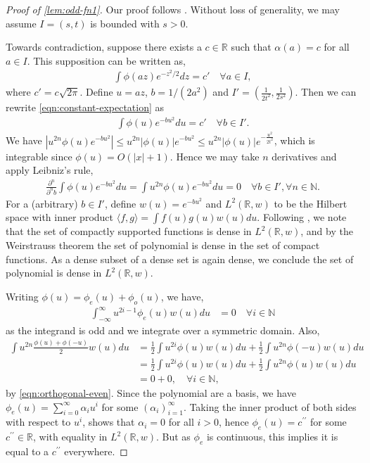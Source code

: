 \documentclass[twoside]{article}
\newcommand{\R}{\mathbb{R}}
\theoremstyle{theoremstyle}
\begin{document}
\begin{proof}[Proof of \cref{lem:odd-fn1}]
Our proof follows \citet{StackExchangeGaussiansDense}.
Without loss of generality, we may assume $I=(s,t)$ is bounded with $s>0$.

Towards contradiction, suppose there exists a $c \in \R$ such that $\alpha(a)=c$ for all $a \in I$. This supposition can be written as,
\begin{align}\label{eqn:constant-expectation}
    \int \phi(az) e^{-z^2/2} dz = c' \quad \forall a \in I,
\end{align}
where $c' = c\sqrt{2\pi}$. Define $u = az$, $b = 1/(2a^2)$ and $I'= \left(\frac{1}{2t^2}, \frac{1}{2s^2}\right)$. Then we can rewrite \cref{eqn:constant-expectation} as 
\begin{align}
    \int \phi(u) e^{-bu^2} du = c' \quad \forall b \in I'.
\end{align}
We have $|u^{2n}\phi(u)e^{-bu^2}|\leq u^{2n}|\phi(u)|e^{-bu^2} \leq   u^{2n}|\phi(u)|e^{-\frac{u^2}{2t^2}}$, which is integrable since $\phi(u)=O(|x|+1)$. Hence we may take $n$ derivatives and apply Leibniz's rule,
\begin{align}\label{eqn:orthogonal-even}
    \frac{\partial^n}{\partial^n b} \int \phi(u) e^{-bu^2} du =  \int u^{2n} \phi(u) e^{-bu^2} du = 0 \quad \forall b \in I', \forall n \in \mathbb{N}.
\end{align}
For a (arbitrary) $b \in I'$, define $w(u) = e^{-bu^2}$ and $L^2(\R, w)$ to be the Hilbert space with inner product $\langle f,g \rangle = \int f(u)g(u)w(u)du$. 
Following 
\citet{126471}, we note that the set of compactly supported functions is dense in $L^2(\R, w)$, and by the Weirstrauss theorem the set of polynomial is dense in the set of compact functions. As a dense subset of a dense set is again dense, we conclude the set of polynomial is dense in $L^2(\R, w)$. 

Writing $\phi(u) = \phi_e(u) + \phi_o(u)$, we have,
\begin{align}
    \int_{-\infty}^\infty u^{2i-1} \phi_e(u) w(u) du &= 0 \quad \forall i \in \mathbb{N}
\end{align}
as the integrand is odd and we integrate over a symmetric domain. Also,
\begin{align}
    \int u^{2n} \frac{\phi(u)+ \phi(-u)}{2}w(u) du &=
    \frac{1}{2}\int u^{2i} \phi(u)w(u) du + \frac{1}{2}\int u^{2n} \phi(-u)w(u) du \\
    &=\frac{1}{2}\int u^{2i} \phi(u)w(u) du + \frac{1}{2}\int u^{2n} \phi(u)w(u) du \\
    &=0 + 0, \quad \forall i \in \mathbb{N},
\end{align}
by \cref{eqn:orthogonal-even}. Since the polynomial are a basis, we have $\phi_e(u) = \sum_{i=0}^\infty \alpha_i u^i$ for some $(\alpha_i)_{i=1}^\infty$. Taking the inner product of both sides with respect to $u^i$, shows that $\alpha_i=0$ for all $i >0$, hence  $\phi_e(u)= c^{\prime\prime}$ for some $c^{\prime\prime} \in \R$, with equality in $L^2(\R,w)$. But as $\phi_e$ is continuous, this implies it is equal to a $c^{\prime\prime}$ everywhere.


\end{proof}
\end{document}
